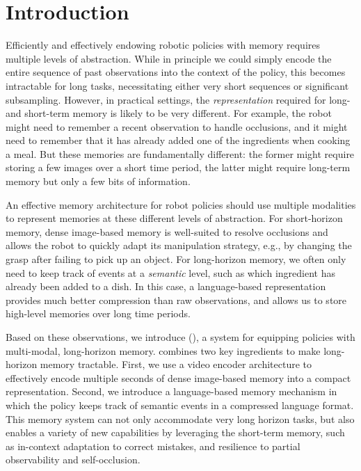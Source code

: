 \section{Introduction}
\label{sec:intro}




Efficiently and effectively endowing robotic policies with memory requires multiple levels of abstraction. While in principle we could simply encode the entire sequence of past observations into the context of the policy, this becomes intractable for long tasks, necessitating either very short sequences or significant subsampling.
However, in practical settings, the \emph{representation} required for long- and short-term memory is likely to be very different. For example, the robot might need to remember a recent observation to handle occlusions, and it might need to remember that it has already added one of the ingredients when cooking a meal. But these memories are fundamentally different: the former might require storing a few images over a short time period, the latter might require long-term memory but only a few bits of information.

An effective memory architecture for robot policies should use multiple modalities to represent memories at these different levels of abstraction. For short-horizon memory, dense image-based memory is well-suited to resolve occlusions and allows the robot to quickly adapt its manipulation strategy, e.g., by changing the grasp after failing to pick up an object. For long-horizon memory, we often only need to keep track of events at a \emph{semantic} level, such as which ingredient has already been added to a dish. In this case, a language-based representation provides much better compression than raw observations, and allows us to store high-level memories over long time periods.

Based on these observations, we introduce \MethodName{} (\Acronym{}), a system for equipping policies with multi-modal, long-horizon memory. \Acronym{} combines two key ingredients to make long-horizon memory tractable. 
First, we use a video encoder architecture to effectively encode multiple seconds of dense image-based memory into a compact representation. Second, we introduce a language-based memory mechanism in which the policy keeps track of semantic events in a compressed language format.
This memory system can not only accommodate very long horizon tasks, but also enables a variety of new capabilities by leveraging the short-term memory, such as in-context adaptation to correct mistakes, and resilience to partial observability and self-occlusion. 

